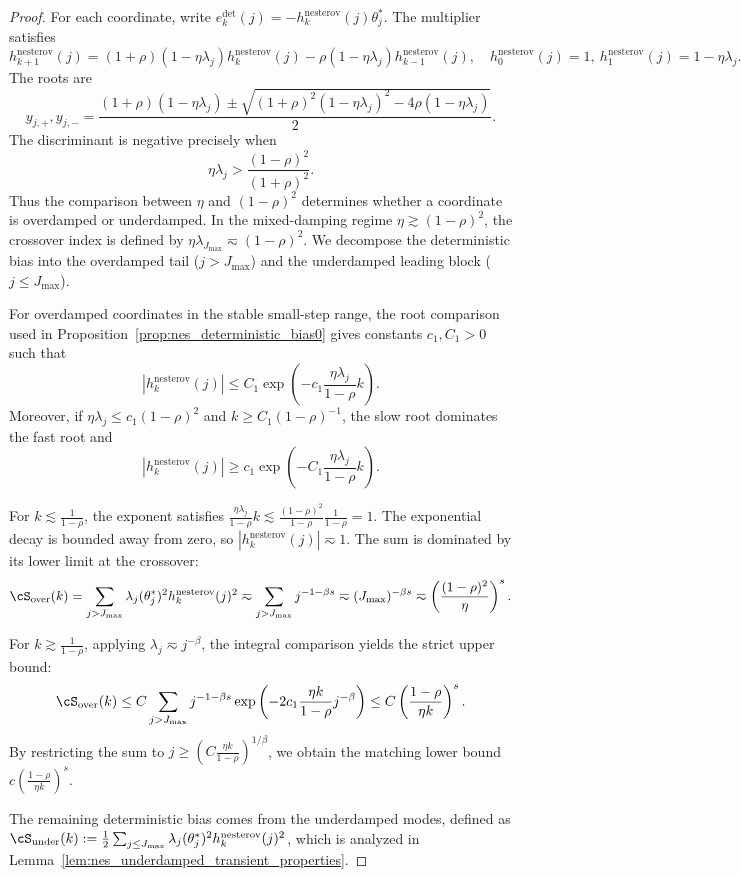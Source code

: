 \documentclass[11pt]{article}
\newcommand{\nesterov}{\mathrm{nesterov}}
\begin{document}
\begin{proof}
For each coordinate, write \(e_k^{\mathrm{det}}(j)=-h_k^{\nesterov}(j)\theta_j^*\). The multiplier satisfies
\[
    h_{k+1}^{\nesterov}(j)
    =
    (1+\rho)(1-\eta\lambda_j)h_k^{\nesterov}(j)
    -\rho(1-\eta\lambda_j)h_{k-1}^{\nesterov}(j),
    \quad
    h_0^{\nesterov}(j)=1,\ 
    h_1^{\nesterov}(j)=1-\eta\lambda_j.
\]
The roots are
\[
    y_{j,+},y_{j,-}
    =
    \frac{(1+\rho)(1-\eta\lambda_j)
    \pm
    \sqrt{(1+\rho)^2(1-\eta\lambda_j)^2-4\rho(1-\eta\lambda_j)}}{2}.
\]
The discriminant is negative precisely when
\[
    \eta\lambda_j>\frac{(1-\rho)^2}{(1+\rho)^2}.
\]
Thus the comparison between $\eta$ and $(1-\rho)^2$ determines whether a coordinate is overdamped or underdamped. In the mixed-damping regime $\eta \gtrsim (1-\rho)^2$, the crossover index is defined by $\eta\lambda_{J_{\max}} \eqsim (1-\rho)^2$. We decompose the deterministic bias into the overdamped tail ($j > J_{\max}$) and the underdamped leading block ($j \le J_{\max}$).

For overdamped coordinates in the stable small-step range, the root comparison used in Proposition~\ref{prop:nes_deterministic_bias0} gives constants $c_1,C_1>0$ such that
\begin{equation*}
    |h_k^{\nesterov}(j)|
    \le
    C_1\exp\left(-c_1\frac{\eta\lambda_j}{1-\rho}k\right).
\end{equation*}
Moreover, if $\eta\lambda_j\le c_1(1-\rho)^2$ and $k\ge C_1(1-\rho)^{-1}$, the slow root dominates the fast root and
\begin{equation*}
    |h_k^{\nesterov}(j)|
    \ge
    c_1\exp\left(-C_1\frac{\eta\lambda_j}{1-\rho}k\right).
\end{equation*}

For $k \lesssim \frac{1}{1-\rho}$, the exponent satisfies $\frac{\eta\lambda_j}{1-\rho}k \lesssim \frac{(1-\rho)^2}{1-\rho}\frac{1}{1-\rho} = 1$. The exponential decay is bounded away from zero, so $|h_k^{\nesterov}(j)| \eqsim 1$. The sum is dominated by its lower limit at the crossover:
\[
    \cS_{\mathrm{over}}(k) = \sum_{j > J_{\max}} \lambda_j(\theta_j^*)^2 h_k^{\nesterov}(j)^2 \eqsim \sum_{j > J_{\max}} j^{-1-\beta s} \eqsim (J_{\max})^{-\beta s} \eqsim \left(\frac{(1-\rho)^2}{\eta}\right)^s.
\]

For $k \gtrsim \frac{1}{1-\rho}$, applying $\lambda_j\eqsim j^{-\beta}$, the integral comparison yields the strict upper bound:
\begin{equation*}
    \cS_{\mathrm{over}}(k)
    \le
    C\sum_{j > J_{\max}}j^{-1-\beta s}
    \exp\left(-2c_1\frac{\eta k}{1-\rho}j^{-\beta}\right)
    \le
    C\left(\frac{1-\rho}{\eta k}\right)^s .
\end{equation*}
By restricting the sum to $j \ge (C\frac{\eta k}{1-\rho})^{1/\beta}$, we obtain the matching lower bound $c\left(\frac{1-\rho}{\eta k}\right)^s$.

The remaining deterministic bias comes from the underdamped modes, defined as $\cS_{\mathrm{under}}(k) := \frac{1}{2} \sum_{j \le J_{\max}} \lambda_j (\theta_j^*)^2 h_k^{\nesterov}(j)^2$, which is analyzed in Lemma~\ref{lem:nes_underdamped_transient_properties}.
\end{proof}
\end{document}
